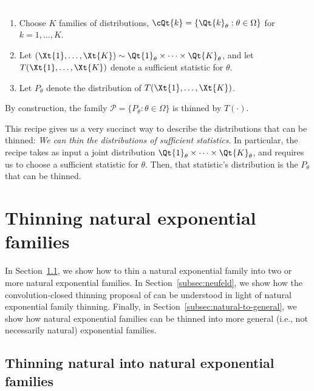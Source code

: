 \documentclass[12pt]{article}
\begin{document}
\begin{algorithm}\label{alg:recipe}
\textcolor{white}{.}
\begin{enumerate}
    \item Choose $K$ families of distributions, $\cQt{k}=\{\Qt{k}_\theta:\theta\in\Omega\}$ for $k=1,\ldots, K$.
    \item Let $(\Xt{1},\ldots,\Xt{K})\sim \Qt{1}_\theta\times\cdots\times\Qt{K}_\theta$, and let  $T(\Xt{1},\ldots,\Xt{K})$ denote a sufficient statistic for $\theta$.
    \item Let $P_\theta$ denote the distribution of $T(\Xt{1},\ldots,\Xt{K})$.  
\end{enumerate}
By construction, the family $\mathcal P=\{P_\theta:\theta\in\Omega\}$ is thinned by $T(\cdot)$.
\end{algorithm}


This recipe gives us a very succinct way to describe the distributions that can be thinned: \emph{We can thin the distributions of sufficient statistics}.
In particular, the recipe takes as input a joint distribution $\Qt{1}_\theta\times\cdots\times\Qt{K}_\theta$, and requires us to choose a sufficient statistic for $\theta$. Then, that statistic's distribution is the $P_\theta$ that can be thinned.




\section{Thinning natural exponential families}
\label{sec:natural-exp-fam}

In Section~\ref{subsec:natural}, we show how to thin a natural exponential family into two or more natural exponential families.  In Section~\ref{subsec:neufeld}, we show how the convolution-closed thinning proposal of \citet{neufeld2023data} can be understood in light of natural exponential family thinning.  Finally, in Section~\ref{subsec:natural-to-general}, we show how natural exponential families can be thinned into more general (i.e., not necessarily natural) exponential families.

\subsection{Thinning natural into natural exponential families} 
\label{subsec:natural}
\end{document}
